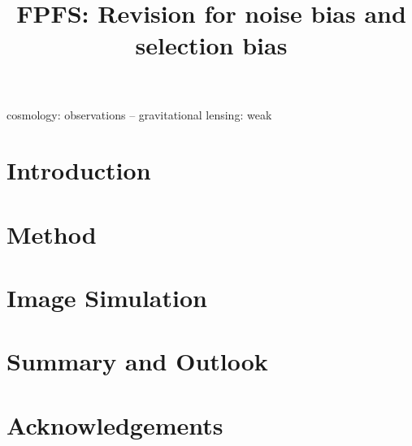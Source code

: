 \documentclass[usenatbib]{mnras}
\title{FPFS: Revision for noise bias and selection bias}
\author[]{}
\begin{document}
\label{firstpage}
\pagerange{\pageref{firstpage}--\pageref{lastpage}}
\maketitle

\begin{abstract}
\end{abstract}

\begin{keywords}
cosmology: observations -- gravitational lensing: weak
\end{keywords}

\section{Introduction}
\label{sec:Intro}


\section{Method}
\label{sec:Method}


\section{Image Simulation}
\label{sec:sim}



\section{Summary and Outlook}
\label{sec:Summary}

\section*{Acknowledgements}



\appendix

\bsp	%
\label{lastpage}
\end{document}

